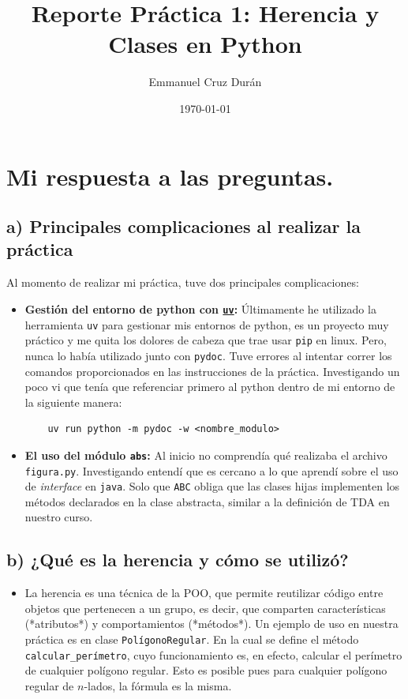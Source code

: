 \documentclass[12pt, letterpaper]{article}
\title{Reporte Práctica 1: Herencia y Clases en Python}
\author{Emmanuel Cruz Durán}
\date{\today}
\begin{document}
\maketitle %

\section{Mi respuesta a las preguntas.}

\subsection*{a) Principales complicaciones al realizar la práctica}

Al momento de realizar mi práctica, tuve dos principales complicaciones:

\begin{itemize}
  \item \textbf{Gestión del entorno de python con \href{https://docs.astral.sh/uv/}{\texttt{uv}}:} Últimamente he utilizado la herramienta \texttt{uv} para gestionar mis entornos de python, es un proyecto muy práctico y me quita los dolores de cabeza que trae usar \texttt{pip} en linux.
    Pero, nunca lo había utilizado junto con \texttt{pydoc}. Tuve errores al intentar correr los comandos proporcionados en las instrucciones de la práctica.
    Investigando un poco vi que tenía que referenciar primero al python dentro de mi entorno de la siguiente manera:
    \begin{verbatim}
    uv run python -m pydoc -w <nombre_modulo>
    \end{verbatim}

  \item \textbf{El uso del módulo \texttt{abs}:} Al inicio no comprendía qué realizaba el archivo \texttt{figura.py}. Investigando entendí que es cercano a lo que aprendí sobre el uso de \textit{interface} en \texttt{java}. Solo que \texttt{ABC} obliga que las clases hijas implementen los métodos declarados en la clase abstracta,
    similar a la definición de TDA en nuestro curso.

\end{itemize}

\subsection*{b) ¿Qué es la herencia y cómo se utilizó?}

\begin{itemize}
  \item La herencia es una técnica de la POO, que permite reutilizar código entre objetos que pertenecen a un grupo, es decir, que comparten características (*atributos*) y comportamientos (*métodos*). 
    Un ejemplo de uso en nuestra práctica es en clase \texttt{PolígonoRegular}. En la cual 
    se define el método \texttt{calcular\_perímetro}, cuyo funcionamiento es, en efecto, calcular el perímetro de cualquier polígono regular. Esto es posible pues para cualquier polígono regular de $n$-lados, 
    la fórmula es la misma.
\end{itemize}
\end{document}
